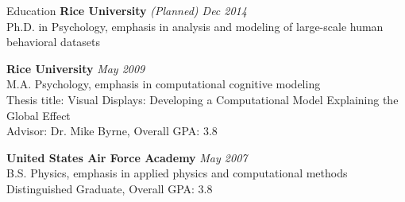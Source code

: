  
\begin{rSection}{Education}
  {\bf Rice University} \hfill {\em (Planned) Dec 2014} \\
  Ph.D. in Psychology, emphasis in analysis and modeling of large-scale human behavioral datasets
\item {\bf Rice University} \hfill {\em May 2009} \\ 
  M.A. Psychology, emphasis in computational cognitive modeling \\
  Thesis title: Visual Displays: Developing a Computational Model Explaining the Global Effect \\
  Advisor: Dr. Mike Byrne, Overall GPA: 3.8
\item {\bf United States Air Force Academy} \hfill {\em May 2007} \\ 
  B.S. Physics, emphasis in applied physics and computational methods \\
  Distinguished Graduate, Overall GPA: 3.8 
\end{rSection}

